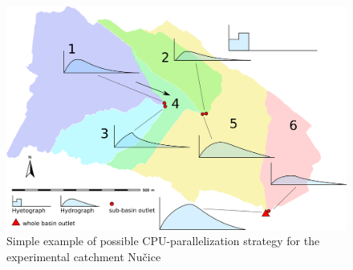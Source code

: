 \begin{figure}[ht!]
  \begin{center}
    \includegraphics[width=1.0\columnwidth]{figures/smoderp-cpu-parallel.png}
    \caption{Simple example of possible CPU-parallelization strategy for the experimental catchment Nučice}
    \label{fig:cpu-parallel}
  \end{center}
\end{figure}




